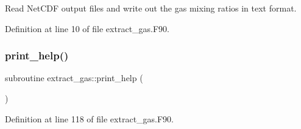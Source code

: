 Read Net\+C\+DF output files and write out the gas mixing ratios in text format. 



Definition at line 10 of file extract\+\_\+gas.\+F90.

\mbox{\label{extract__gas_8_f90_a1b81e33499016217dd603ff8e06d42bf}} 
\subsubsection{\texorpdfstring{print\+\_\+help()}{print\_help()}}
{\footnotesize\ttfamily subroutine extract\+\_\+gas\+::print\+\_\+help (\begin{DoxyParamCaption}{ }\end{DoxyParamCaption})}



Definition at line 118 of file extract\+\_\+gas.\+F90.

